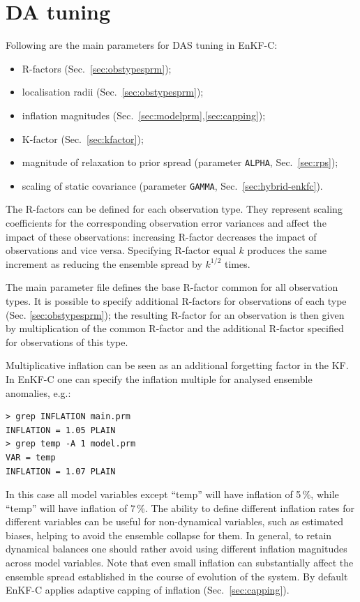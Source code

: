 \documentclass[11pt]{report}
\begin{document}
\section{DA tuning}
\label{sec:datuning}

Following are the main parameters for DAS tuning in EnKF-C:
\begin{itemize}
\item R-factors (Sec.~\ref{sec:obstypesprm});
\item localisation radii (Sec.~\ref{sec:obstypesprm});
\item inflation magnitudes (Sec.~\ref{sec:modelprm},\ref{sec:capping});
\item K-factor (Sec.~\ref{sec:kfactor});
\item magnitude of relaxation to prior spread (parameter \verb|ALPHA|, Sec.~\ref{sec:rps});
  \item scaling of static covariance (parameter \verb|GAMMA|, Sec.~\ref{sec:hybrid-enkfc}).
\end{itemize}

The R-factors can be defined for each observation type.
They represent scaling coefficients for the corresponding observation error variances and affect the impact of these observations: increasing R-factor decreases the impact of observations and vice versa.
Specifying R-factor equal $k$ produces the same increment as reducing the ensemble spread by $k^{1/2}$ times.

The main parameter file defines the base R-factor common for all observation types.
It is possible to specify additional R-factors for observations of each type (Sec. \ref{sec:obstypesprm}); the resulting R-factor for an observation is then given by multiplication of the common R-factor and the additional R-factor specified for observations of this type.

Multiplicative inflation can be seen as an additional forgetting factor in the KF.
In EnKF-C one can specify the inflation multiple for analysed ensemble anomalies, e.g.:
\begin{Verbatim}[frame=single,fontsize=\footnotesize]
> grep INFLATION main.prm
INFLATION = 1.05 PLAIN
> grep temp -A 1 model.prm
VAR = temp
INFLATION = 1.07 PLAIN
\end{Verbatim}
In this case all model variables except ``temp'' will have inflation of 5\,\%, while ``temp'' will have inflation of 7\,\%.
The ability to define different inflation rates for different variables can be useful for non-dynamical variables, such as estimated biases, helping to avoid the ensemble collapse for them.
In general, to retain dynamical balances one should rather avoid using different inflation magnitudes across model variables.
Note that even small inflation can substantially affect the ensemble spread established in the course of evolution of the system.
By default EnKF-C applies adaptive capping of inflation (Sec.~\ref{sec:capping}).
\end{document}
